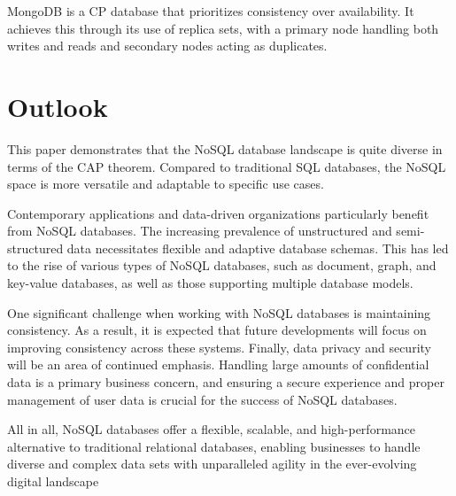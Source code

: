MongoDB is a CP database that prioritizes consistency over availability. It achieves this through its use of replica sets, with a primary node handling both writes and reads and secondary nodes acting as duplicates.

\section*{Outlook}

This paper demonstrates that the NoSQL database landscape is quite diverse in terms of the CAP theorem. Compared to traditional SQL databases, the NoSQL space is more versatile and adaptable to specific use cases.

Contemporary applications and data-driven organizations particularly benefit from NoSQL databases. The increasing prevalence of unstructured and semi-structured data necessitates flexible and adaptive database schemas. This has led to the rise of various types of NoSQL databases, such as document, graph, and key-value databases, as well as those supporting multiple database models.

One significant challenge when working with NoSQL databases is maintaining consistency. As a result, it is expected that future developments will focus on improving consistency across these systems. Finally, data privacy and security will be an area of continued emphasis. Handling large amounts of confidential data is a primary business concern, and ensuring a secure experience and proper management of user data is crucial for the success of NoSQL databases.

All in all, NoSQL databases offer a flexible, scalable, and high-performance alternative to traditional relational databases, enabling businesses to handle diverse and complex data sets with unparalleled agility in the ever-evolving digital landscape
